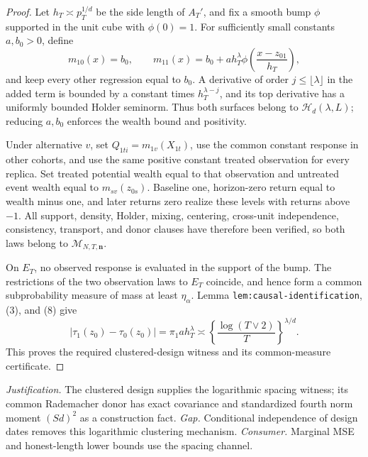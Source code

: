 \documentclass{article}
\begin{document}
\begin{proof}
Let \(h_T\asymp p_T^{1/d}\) be the side length of \(A_T'\), and fix a smooth bump \(\phi\) supported in the unit cube with \(\phi(0)=1\).  For sufficiently small constants \(a,b_0>0\), define
\[
 m_{10}(x)=b_0,
 \qquad
 m_{11}(x)=b_0+ah_T^\lambda
 \phi\!\left(\frac{x-z_{01}}{h_T}\right),                 \tag{8}
\]
and keep every other regression equal to \(b_0\).  A derivative of order \(j\le\lfloor\lambda\rfloor\) in the added term is bounded by a constant times \(h_T^{\lambda-j}\), and its top derivative has a uniformly bounded Holder seminorm.  Thus both surfaces belong to \(\mathcal H_d(\lambda,L)\); reducing \(a,b_0\) enforces the wealth bound and positivity.

Under alternative \(v\), set \(Q_{1ti}=m_{1v}(X_{1t})\), use the common constant response in other cohorts, and use the same positive constant treated observation for every replica.  Set treated potential wealth equal to that observation and untreated event wealth equal to \(m_{sv}(z_{0s})\).  Baseline one, horizon-zero return equal to wealth minus one, and later returns zero realize these levels with returns above \(-1\).  All support, density, Holder, mixing, centering, cross-unit independence, consistency, transport, and donor clauses have therefore been verified, so both laws belong to \(\mathcal M_{N,T,\mathbf n}\).

On \(E_T\), no observed response is evaluated in the support of the bump.  The restrictions of the two observation laws to \(E_T\) coincide, and hence form a common subprobability measure of mass at least \(\eta_\alpha\).  Lemma \texttt{lem:causal-identification}, (3), and (8) give
\[
 |\tau_1(z_0)-\tau_0(z_0)|
 =\pi_1ah_T^\lambda
 \asymp\left\{\frac{\log(T\vee2)}{T}\right\}^{\lambda/d}. \tag{9}
\]
This proves the required clustered-design witness and its common-measure certificate.
\end{proof}
\par\smallskip\noindent \textit{Justification.} The clustered design supplies the logarithmic spacing witness; its common Rademacher donor has exact covariance and standardized fourth norm moment \((Sd)^2\) as a construction fact. \textit{Gap.} Conditional independence of design dates removes this logarithmic clustering mechanism. \textit{Consumer.} Marginal MSE and honest-length lower bounds use the spacing channel.
\end{document}
